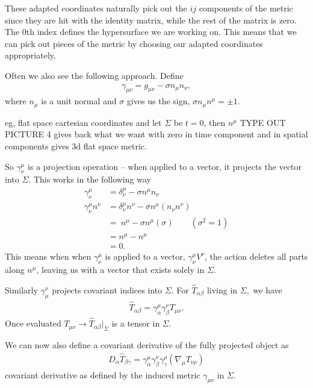 \documentclass[10pt]{article}
\begin{document}
	These adapted coordinates naturally pick out the $ij$ components of the metric since they are hit with the identity matrix, while the rest of the matrix is zero. The 0th index defines the hypersurface we are working on. This means that we can pick out pieces of the metric by choosing our adapted coordinates appropriately. 
	
	
	Often we also see the following approach. Define 
	\begin{align}
	\gamma_{\mu \nu} = g_{\mu \nu} - \sigma n_\mu n_\nu,
	\end{align}
	 where $n_\mu$ is a unit normal and $\sigma$ gives us the sign, $\sigma n_\mu n^\mu = \pm 1$. 
	
	eg, flat space cartesian coordinates and let $\Sigma$ be $t=0$, then $n^\mu$ TYPE OUT PICTURE 4 gives back what we want with zero in time component and in spatial components gives 3d flat space metric. 
	
	So $\gamma ^\mu _\nu$ is a projection operation -- when applied to a vector, it projects the vector into $\Sigma$. This works in the following way 
	\begin{align*}
	\gamma ^\mu _\nu &= \delta ^\mu _\nu -\sigma n^\mu n_\nu \\
	\gamma ^\mu _\nu n^\nu &= \delta ^\mu _\nu n^\nu - \sigma n^\mu (n_\nu n^\nu)\\
	 &= \ n^\mu - \sigma n^\mu (\sigma) \quad \quad (\sigma^2 = 1) \\
	&= n^\mu -n^\mu \\&= 0.
	\end{align*}
	This means when when $\gamma ^\mu _\nu$ is applied to a vector, $\gamma ^\mu _\nu V^\nu$, the action deletes all parts along $n^\mu$, leaving us with a vector that exists solely in $\Sigma$. 
	
	Similarly $\gamma _\mu ^\nu$ projects covariant indices into $\Sigma$. For $\hat T _{\alpha \beta}$ living in $\Sigma,$ we have 
	\begin{align}
	\hat T _{\alpha \beta} = \gamma_\alpha^\mu \gamma_\beta^\nu T_{\mu \nu} .
	\end{align}  
	Once evaluated  $T_{\mu \nu}  \to \hat T _{\alpha \beta}|_\Sigma$ is a tensor in $\Sigma$. 
	
	We can now also define a covariant derivative of the fully projected object as 
	\begin{align}
	D_\alpha \hat T_{\beta \gamma} = \gamma_{\alpha}^\mu  \gamma_{\beta}^\nu   \gamma_{\gamma}^\rho \left(\nabla_\mu T_{\nu \rho}\right) 
	\end{align}
	covariant derivative as defined by the induced metric $\gamma_{\mu \nu}$ in $\Sigma$.
	
\end{document}
